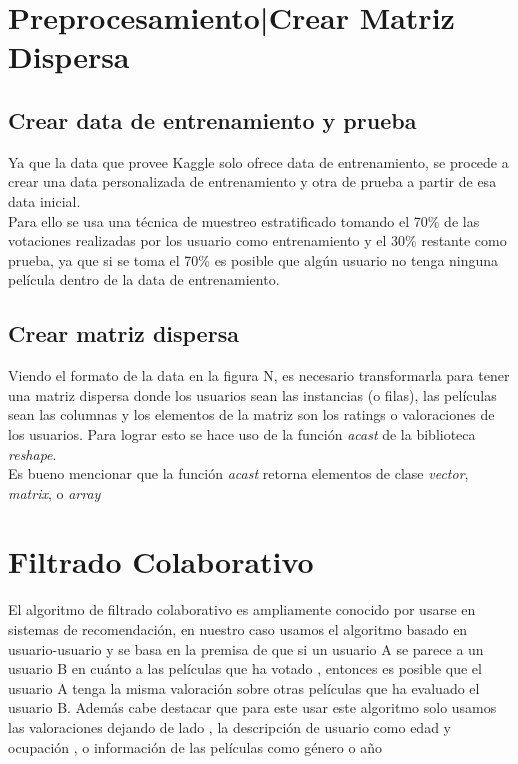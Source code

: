 \documentclass{sciposter}
\begin{document}
\begin{multicols}{3}
\section{Preprocesamiento|Crear Matriz Dispersa}


\subsection{Crear data de entrenamiento y prueba}
Ya que la data que provee Kaggle solo ofrece data de entrenamiento, se procede a crear una data personalizada de entrenamiento y otra de prueba a partir de esa data inicial.\\ 
Para ello se usa una t\'ecnica de muestreo estratificado tomando el 70\% de las votaciones realizadas por los usuario como entrenamiento y el 30\%  restante como prueba, ya que si se toma el 70\% es posible que alg\'un usuario no tenga ninguna pel\'icula dentro de la data de entrenamiento.


\subsection{Crear matriz dispersa}
Viendo el formato de la data en la figura N, es necesario transformarla para  tener una matriz dispersa donde los usuarios sean las instancias (o filas), las pel\'iculas sean las columnas y los elementos de la matriz son los ratings o valoraciones de los usuarios. Para lograr esto se hace uso de la funci\'on \emph{acast} de la biblioteca \emph{reshape}.\\ 
Es bueno mencionar que la funci\'on \emph{acast} retorna elementos de clase \emph{vector}, \emph{matrix}, o \emph{array}


\section{Filtrado Colaborativo }
 
El algoritmo de filtrado colaborativo es ampliamente  conocido por usarse en sistemas de recomendaci\'on, en nuestro caso usamos el algoritmo basado en usuario-usuario y se basa en la premisa de que si un usuario A se parece a un usuario B en cu\'anto a las pel\'iculas que ha votado , entonces es posible que el usuario A tenga la misma valoraci\'on sobre otras pel\'iculas que ha evaluado el usuario B.
Adem\'as cabe destacar que para este usar este algoritmo solo usamos las valoraciones dejando de lado , la descripci\'on de usuario como edad y ocupaci\'on , o informaci\'on de las pel\'iculas como g\'enero o a\~no


\end{multicols}
\end{document}
